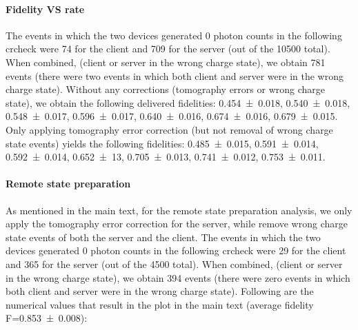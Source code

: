 \paragraph{Fidelity VS rate}

The events in which the two devices generated \num{0} photon counts in the following
\acrshort{crcheck} were \num{74} for the client and \num{709} for the server (out of the \num{10500}
total). When combined, (client or server in the wrong charge state), we obtain \num{781} events
(there were two events in which both client and server were in the wrong charge state). Without any
corrections (tomography errors or wrong charge state), we obtain the following delivered fidelities:
\num{0.454(18)}, \num{0.540(18)}, \num{0.548(17)}, \num{0.596(17)}, \num{0.640(16)},
\num{0.674(16)}, \num{0.679(15)}. Only applying tomography error correction (but not removal of
wrong charge state events) yields the following fidelities: \num{0.485(15)}, \num{0.591(14)},
\num{0.592(14)}, \num{0. 652(13)}, \num{0.705(13)}, \num{0.741(12)}, \num{0.753(11)}.

\paragraph{Remote state preparation}

As mentioned in the main text, for the remote state preparation analysis, we only apply the
tomography error correction for the server, while remove wrong charge state events of both the
server and the client. The events in which the two devices generated \num{0} photon counts in the
following \acrshort{crcheck} were \num{29} for the client and \num{365} for the server (out of the
\num{4500} total). When combined, (client or server in the wrong charge state), we obtain \num{394}
events (there were zero events in which both client and server were in the wrong charge state).
Following are the numerical values that result in the plot in the main text (average fidelity
F=\num{0.853(8)}):

